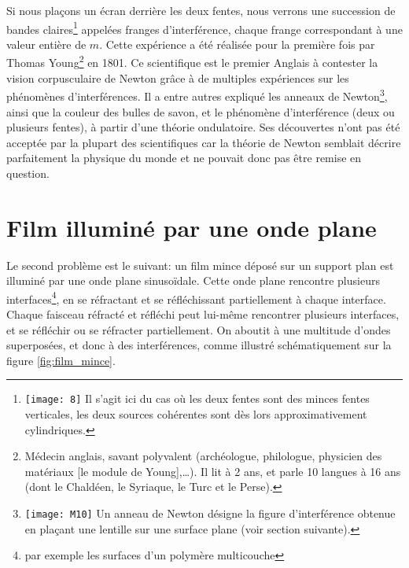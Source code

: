  Si nous plaçons un écran derrière les deux fentes, nous verrons une succession de bandes claires\footnote{\texttt{[image: 8]} Il s'agit ici du cas où les deux fentes sont des minces fentes verticales, les deux sources cohérentes sont dès lors approximativement cylindriques.} appelées franges d'interférence, chaque frange correspondant à une valeur entière de $m$. Cette expérience a été réalisée pour la première fois par Thomas Young\footnote{Médecin anglais, savant polyvalent (archéologue, philologue, physicien des matériaux [le module de Young],…).
 Il lit à 2 ans, et parle 10 langues à 16 ans (dont le Chaldéen, le Syriaque, le Turc et le Perse).} en 1801. Ce scientifique est le premier Anglais à contester la vision corpusculaire de Newton grâce à de multiples expériences sur les phénomènes d'interférences. Il a entre autres expliqué les anneaux de Newton\footnote{\texttt{[image: M10]} Un anneau de Newton désigne la figure d'interférence obtenue en plaçant une lentille sur une surface plane (voir section suivante).}, ainsi que la couleur des bulles de savon, et le phénomène d'interférence (deux ou plusieurs fentes), à partir d'une théorie ondulatoire. Ses découvertes n'ont pas été acceptée par la plupart des scientifiques car la théorie de Newton semblait décrire parfaitement la physique du monde et ne pouvait donc pas être remise en question.
 



\section{Film illuminé par une onde plane}
\label{film_onde_plane}

Le second problème est le suivant: un film mince déposé sur un support plan est illuminé par une onde plane sinusoïdale. Cette onde plane rencontre plusieurs interfaces\footnote{par exemple les surfaces d'un polymère multicouche}, en se réfractant et se réfléchissant partiellement à chaque interface. Chaque faisceau réfracté et réfléchi peut lui-même rencontrer plusieurs interfaces, et se réfléchir ou se réfracter partiellement. On aboutit à une multitude d'ondes superposées, et donc à des interférences, comme illustré schématiquement sur la figure \ref{fig:film_mince}.

